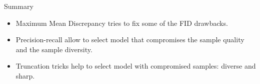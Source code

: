 \begin{frame}{Summary}
	\begin{itemize}
		\item Maximum Mean Discrepancy tries to fix some of the FID drawbacks.
		\vfill
		\item Precision-recall allow to select model that compromises the sample quality and the sample diversity.	
		\vfill 
		\item Truncation tricks help to select model with compromised samples: diverse and sharp.
	\end{itemize}
\end{frame}
 